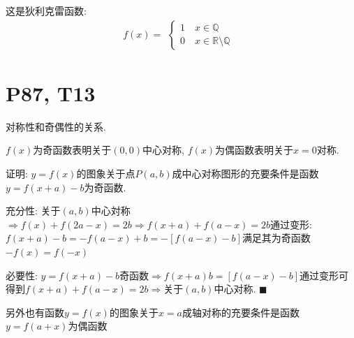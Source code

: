 \documentclass{book}
\begin{document}
这是\textcolor[rgb]{0.38,0.11,0.2}{狄利克雷函数}:
$$
    f(x)=\begin{array}{l}
        \left\{\begin{matrix}
                   1 \quad x \in \mathbb{Q} \\
                   0 \quad x \in \mathbb{R} \setminus \mathbb{Q} \
               \end{matrix}\right.
    \end{array}
$$

\section{\textcolor[rgb]{0.11,0.65,0.52}{P87, T13}}
\textcolor[rgb]{0.38,0.11,0.2}{对称性}和\textcolor[rgb]{0.38,0.11,0.2}{奇偶性}的关系.

$f(x)$为奇函数表明关于$(0,0)$中心对称, $f(x)$为偶函数表明关于$x=0$对称.

\begin{boxB}
    证明: $y=f(x)$的图象关于点$P(a,b)$成中心对称图形的充要条件是函数$y=f(x+a)-b$为奇函数.
\end{boxB}

\textcolor[rgb]{0.75,0.17,0.22}{充分性}:
关于$(a,b)$中心対称$\Longrightarrow f(x)+f(2a-x)=2b\Longrightarrow f(x+a)+f(a-x)=2b$通过变形:$f(x+a)-b=-f(a-x)+b=-[f(a-x)-b]$满足其为奇函数$-f(x)=f(-x)$

\textcolor[rgb]{0.75,0.17,0.22}{必要性}:
$y=f(x+a)-b$奇函数$\Longrightarrow f(x+a)b=[f(a-x)-b]$通过变形可得到$f(x+a)+f(a-x)=2b$$\Longrightarrow$关于$(a,b)$中心对称. $\blacksquare$

    另外也有函数$y=f(x)$的图象关于$x=a$成轴对称的充要条件是函数$y=f(a+x)$为偶函数
\end{document}
